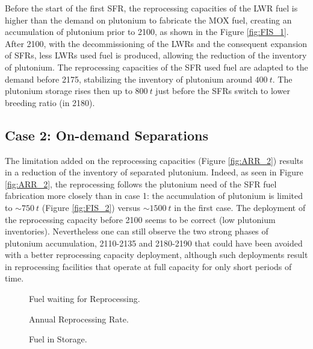 \documentclass[12pt]{article}
\begin{document}
Before the start of the first SFR, the reprocessing capacities of the LWR fuel
is higher than the demand on plutonium to fabricate the MOX fuel, creating an
accumulation of plutonium prior to 2100, as shown in the Figure \ref{fig:FIS_1}.
After 2100, with the decommissioning of the LWRs and the consequent expansion of
SFRs, less LWRs used fuel is produced, allowing the reduction of the inventory
of plutonium. The reprocessing capacities of the SFR used fuel are adapted to
the demand before 2175, stabilizing the inventory of plutonium around $400~t$.
The plutonium storage rises then up to $800~t$ just before the SFRs switch
to lower breeding ratio (in 2180).
 

\subsection{Case 2: On-demand Separations}

The limitation added on the reprocessing capacities (Figure \ref{fig:ARR_2})
results in a reduction of the inventory of separated plutonium. Indeed, as seen
in Figure \ref{fig:ARR_2}, the reprocessing follows the plutonium need of the
SFR fuel fabrication more closely than in case 1: the accumulation of plutonium
is limited to $\sim750~t$ (Figure \ref{fig:FIS_2}) versus $\sim1500~t$ in the
first case. The deployment of the reprocessing capacity before 2100 seems to be
correct (low plutonium inventories). Nevertheless one can still observe
the two strong phases of plutonium accumulation, 2110-2135 and 2180-2190 that
could have been avoided with a better reprocessing capacity deployment, although
such deployments result in reprocessing facilities that operate at full capacity
for only short periods of time.

\begin{figure}[h!]
    \centering
    \caption{Fuel waiting for Reprocessing.\label{fig:ARR_FWR_SFC} }
\end{figure}
\begin{figure}[h!]
    \centering
    \caption{Annual Reprocessing Rate.\label{fig:ARR_FWR_SFC_2} }
\end{figure}
\begin{figure}[h!]
    \centering
    \caption{Fuel in Storage.\label{fig:ARR_FWR_SFC_2} }
\end{figure}
\end{document}
